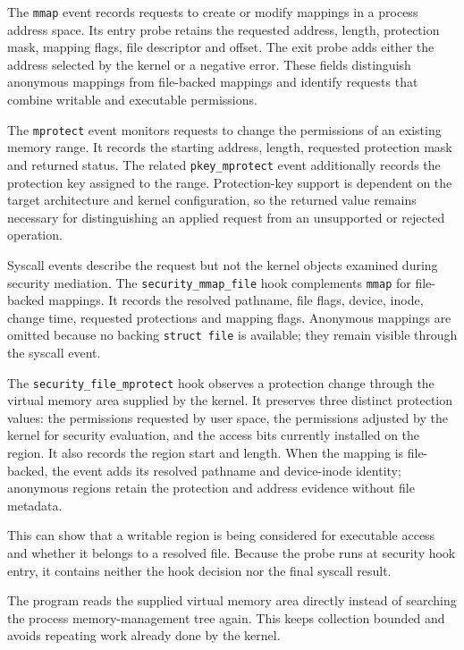 The \texttt{mmap} event records requests to create or modify mappings in a
process address space. Its entry probe retains the requested address, length,
protection mask, mapping flags, file descriptor and offset. The exit probe
adds either the address selected by the kernel or a negative error. These
fields distinguish anonymous mappings from file-backed mappings and identify
requests that combine writable and executable permissions.

The \texttt{mprotect} event monitors requests to change the permissions of an
existing memory range. It records the starting address, length, requested
protection mask and returned status. The related
\texttt{pkey\_mprotect} event additionally records the protection key assigned
to the range. Protection-key support is dependent on the target architecture
and kernel configuration, so the returned value remains necessary for
distinguishing an applied request from an unsupported or rejected operation.

Syscall events describe the request but not the kernel objects examined during
security mediation. The
\texttt{security\_mmap\_file} hook complements \texttt{mmap} for file-backed
mappings. It records the resolved pathname, file flags, device, inode, change
time, requested protections and mapping flags. Anonymous mappings are omitted
because no backing \texttt{struct file} is available; they remain visible
through the syscall event.

The \texttt{security\_file\_mprotect} hook observes a protection change through
the virtual memory area supplied by the kernel. It preserves three distinct
protection values: the permissions requested by user space, the permissions
adjusted by the kernel for security evaluation, and the access bits currently
installed on the region. It also records the region start and length. When the
mapping is file-backed, the event adds its resolved pathname and
device-inode identity; anonymous regions retain the protection and address
evidence without file metadata.

This can show that a writable region is being considered for executable access
and whether it belongs to a resolved file. Because the probe runs at security
hook entry, it contains neither the hook decision nor the final syscall result.

The program reads the supplied virtual memory area directly instead of
searching the process memory-management tree again. This keeps collection
bounded and avoids repeating work already done by the kernel.

